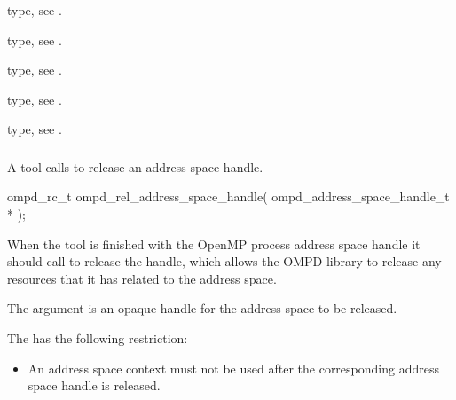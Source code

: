 \begin{crossrefs}
\item {} type, see .

\item {} type, see .

\item {} type, 
see .

\item {} type, 
see .

\item {} type, see .
\end{crossrefs}



\subsubsection{}
\label{subsubsubsec:ompd_rel_address_space_handle}

\summary
A tool calls  to release an address space
handle.

\format
\begin{cspecific}
\begin{ompSyntax}
ompd_rc_t ompd_rel_address_space_handle(
  ompd_address_space_handle_t *
);
\end{ompSyntax}
\end{cspecific}

\descr
When the tool is finished with the OpenMP process address space handle it
should call  to release the handle, 
which allows the OMPD library to release any resources that it has related 
to the address space.

\argdesc
The  argument is an opaque handle for the address space to be released.

\restrictions
The  has the following restriction:

\begin{itemize}
\item An address space context must not be used after the corresponding 
      address space handle is released.
\end{itemize}

